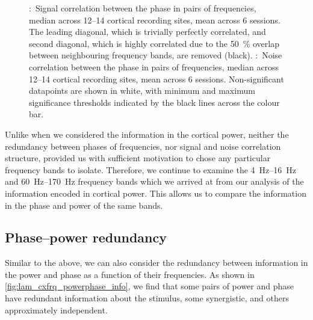 \begin{figure}[tbp]
    \centering
    \hspace*{\fill}
    \hspace*{\fill}\hspace{.4cm}\hspace*{\fill}
    \hspace*{\fill}
    \caption{
\protect{}:~Signal correlation between the phase in pairs of frequencies, median across \numrange{12}{14} cortical recording sites, mean across \num{6} sessions.
The leading diagonal, which is trivially perfectly correlated, and second diagonal, which is highly correlated due to the \SI{50}{\percent} overlap between neighbouring frequency bands, are removed (black).
\protect{}:~Noise correlation between the phase in pairs of frequencies, median across \numrange{12}{14} cortical recording sites, mean across \num{6} sessions.
Non-significant datapoints are shown in white, with minimum and maximum significance thresholds indicated by the black lines across the colour bar.
}
\label{fig:lam_noisesignal_corr_phase}
\end{figure}


Unlike when we considered the information in the cortical power, neither the redundancy between phases of frequencies, nor signal and noise correlation structure, provided us with sufficient motivation to chose any particular frequency bands to isolate.
Therefore, we continue to examine the \SIrange{4}{16}{Hz} and \SIrange{60}{170}{Hz} frequency bands which we arrived at from our analysis of the information encoded in cortical power.
This allows us to compare the information in the phase and power of the same bands.


\subsection{Phase--power redundancy}

Similar to the above, we can also consider the redundancy between information in the power and phase as a function of their frequencies.
As shown in \autoref{fig:lam_cxfrq_powerphase_info}, we find that some pairs of power and phase have redundant information about the stimulus, some synergistic, and others approximately independent.


